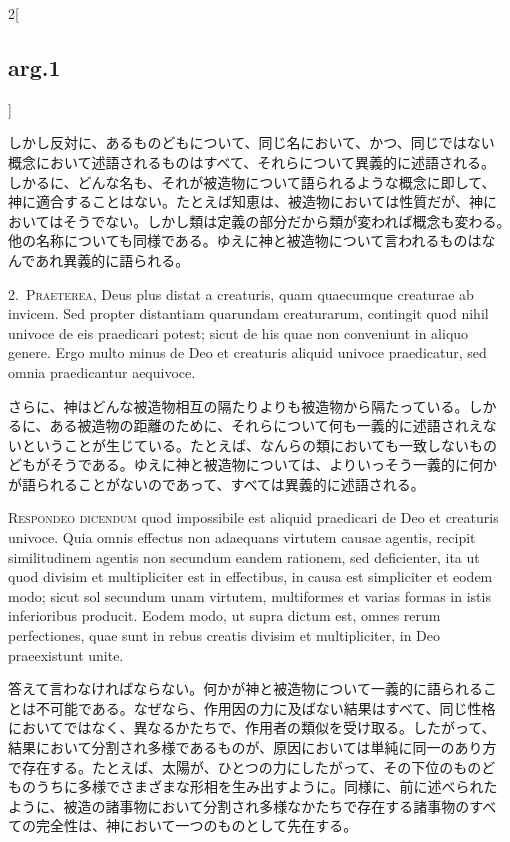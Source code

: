 \documentclass[paper=a4paper,fontsize=10pt,jafontsize=9pt,titlepage]{jlreq}
\begin{document}
\begin{paracol}{2}[\subsection{arg.1}]
\switchcolumn

しかし反対に、あるものどもについて、同じ名において、かつ、同じではない
概念において述語されるものはすべて、それらについて異義的に述語される。
しかるに、どんな名も、それが被造物について語られるような概念に即して、
神に適合することはない。たとえば知恵は、被造物においては性質だが、神に
おいてはそうでない。しかし類は定義の部分だから類が変われば概念も変わる。
他の名称についても同様である。ゆえに神と被造物について言われるものはな
んであれ異義的に語られる。


2.~{\scshape Praeterea}, Deus plus distat a creaturis, quam quaecumque
creaturae ab invicem. Sed propter distantiam quarundam creaturarum,
contingit quod nihil univoce de eis praedicari potest; sicut de his
quae non conveniunt in aliquo genere. Ergo multo minus de Deo et
creaturis aliquid univoce praedicatur, sed omnia praedicantur
aequivoce.

\switchcolumn

さらに、神はどんな被造物相互の隔たりよりも被造物から隔たっている。しか
るに、ある被造物の距離のために、それらについて何も一義的に述語されえな
いということが生じている。たとえば、なんらの類においても一致しないもの
どもがそうである。ゆえに神と被造物については、よりいっそう一義的に何か
が語られることがないのであって、すべては異義的に述語される。


{\scshape Respondeo dicendum} quod impossibile est aliquid praedicari de
Deo et creaturis univoce. Quia omnis effectus non adaequans virtutem
causae agentis, recipit similitudinem agentis non secundum eandem
rationem, sed deficienter, ita ut quod divisim et multipliciter est in
effectibus, in causa est simpliciter et eodem modo; sicut sol secundum
unam virtutem, multiformes et varias formas in istis inferioribus
producit. Eodem modo, ut supra dictum est, omnes rerum perfectiones,
quae sunt in rebus creatis divisim et multipliciter, in Deo
praeexistunt unite.

\switchcolumn

答えて言わなければならない。何かが神と被造物について一義的に語られるこ
とは不可能である。なぜなら、作用因の力に及ばない結果はすべて、同じ性格
においてではなく、異なるかたちで、作用者の類似を受け取る。したがって、
結果において分割され多様であるものが、原因においては単純に同一のあり方
で存在する。たとえば、太陽が、ひとつの力にしたがって、その下位のものど
ものうちに多様でさまざまな形相を生み出すように。同様に、前に述べられた
ように、被造の諸事物において分割され多様なかたちで存在する諸事物のすべ
ての完全性は、神において一つのものとして先在する。


\end{paracol}
\end{document}
